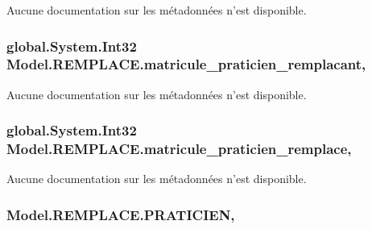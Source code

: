 Aucune documentation sur les métadonnées n'est disponible. 

\hypertarget{class_model_1_1_r_e_m_p_l_a_c_e_a43176ce5aac61a5dbb677d871f8f2c32}{
\subsubsection[{matricule\-\_\-praticien\-\_\-remplacant}]{\setlength{\rightskip}{0pt plus 5cm}global.\-System.\-Int32 Model.\-R\-E\-M\-P\-L\-A\-C\-E.\-matricule\-\_\-praticien\-\_\-remplacant\hspace{0.3cm}{\ttfamily [get]}, {\ttfamily [set]}}}\label{class_model_1_1_r_e_m_p_l_a_c_e_a43176ce5aac61a5dbb677d871f8f2c32}


Aucune documentation sur les métadonnées n'est disponible. 

\hypertarget{class_model_1_1_r_e_m_p_l_a_c_e_ac3e241e1a97864f915ca369bd99dfde3}{
\subsubsection[{matricule\-\_\-praticien\-\_\-remplace}]{\setlength{\rightskip}{0pt plus 5cm}global.\-System.\-Int32 Model.\-R\-E\-M\-P\-L\-A\-C\-E.\-matricule\-\_\-praticien\-\_\-remplace\hspace{0.3cm}{\ttfamily [get]}, {\ttfamily [set]}}}\label{class_model_1_1_r_e_m_p_l_a_c_e_ac3e241e1a97864f915ca369bd99dfde3}


Aucune documentation sur les métadonnées n'est disponible. 

\hypertarget{class_model_1_1_r_e_m_p_l_a_c_e_ae390942d049897645a0751dda7578846}{
\subsubsection[{P\-R\-A\-T\-I\-C\-I\-E\-N}]{ Model.\-R\-E\-M\-P\-L\-A\-C\-E.\-P\-R\-A\-T\-I\-C\-I\-E\-N\hspace{0.3cm}{\ttfamily [get]}, {\ttfamily [set]}}}\label{class_model_1_1_r_e_m_p_l_a_c_e_ae390942d049897645a0751dda7578846}


